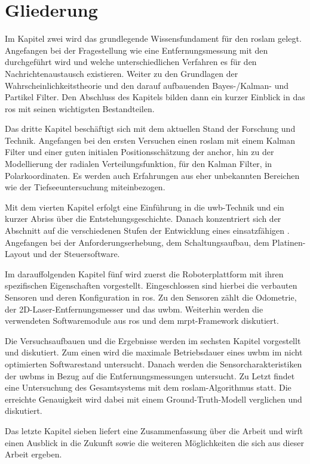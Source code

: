\section{Gliederung}

Im Kapitel zwei wird das grundlegende Wissensfundament für den \Gls{roslam} gelegt. Angefangen bei der Fragestellung wie eine Entfernungsmessung mit den  durchgeführt wird und welche unterschiedlichen Verfahren es für den Nachrichtenaustausch existieren. Weiter zu den Grundlagen der Wahrscheinlichkeitstheorie und den darauf aufbauenden Bayes-/Kalman- und Partikel Filter. Den Abschluss des Kapitels bilden dann ein kurzer Einblick in das \Gls{ros} mit seinen wichtigsten Bestandteilen.

Das dritte Kapitel beschäftigt sich mit dem aktuellen Stand der Forschung und Technik. Angefangen bei den ersten Versuchen einen \Gls{roslam} mit einem Kalman Filter und einer guten initialen Positionsschätzung der \Gls{anchor}, hin zu der Modellierung der radialen Verteilungsfunktion, für den Kalman Filter, in Polarkoordinaten. Es werden auch Erfahrungen aus eher unbekannten Bereichen wie der Tiefseeuntersuchung miteinbezogen.

Mit dem vierten Kapitel erfolgt eine Einführung in die \Gls{uwb}-Technik und ein kurzer Abriss über die Entstehungsgeschichte. Danach konzentriert sich der Abschnitt auf die verschiedenen Stufen der Entwicklung eines einsatzfähigen . Angefangen bei der Anforderungserhebung, dem Schaltungsaufbau, dem Platinen-Layout und der Steuersoftware.

Im darauffolgenden Kapitel fünf wird zuerst die Roboterplattform mit ihren spezifischen Eigenschaften vorgestellt. Eingeschlossen sind hierbei die verbauten Sensoren und deren Konfiguration in \Gls{ros}. Zu den Sensoren zählt die Odometrie, der 2D-Laser-Entfernungsmesser und das \Gls{uwbm}. Weiterhin werden die verwendeten Softwaremodule aus \Gls{ros} und dem \Gls{mrpt}-Framework diskutiert.

Die Versuchsaufbauen und die Ergebnisse werden im sechsten Kapitel vorgestellt und diskutiert. Zum einen wird die maximale Betriebsdauer eines \Gls{uwbm} im nicht optimierten Softwarestand untersucht. Danach werden die Sensorcharakteristiken der \Glspl{uwbm} in Bezug auf die Entfernungsmessungen untersucht. Zu Letzt findet eine Untersuchung des Gesamtsystems mit dem \Gls{roslam}-Algorithmus statt. Die erreichte Genauigkeit wird dabei mit einem Ground-Truth-Modell verglichen und diskutiert.

Das letzte Kapitel sieben liefert eine Zusammenfassung über die Arbeit und wirft einen Ausblick in die Zukunft sowie die weiteren Möglichkeiten die sich aus dieser Arbeit ergeben.


